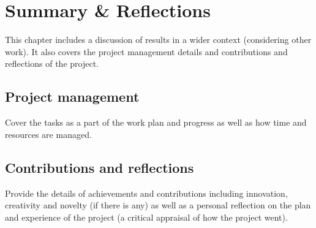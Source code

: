 \chapter{Summary \& Reflections}
\label{ch:summary}
This chapter includes a discussion of results in a wider context (considering other work). It also covers the project management details and contributions and reflections of the project.

\section{Project management}
Cover the tasks as a part of the work plan and progress as well as how time and resources are managed.
\section{Contributions and reflections}
Provide the details of achievements and contributions including innovation, creativity and novelty (if there is any) as well as a personal reflection on the plan and experience of the project (a critical appraisal of how the project went).
